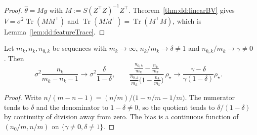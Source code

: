 \begin{proof}
  \leanok
$\hat\theta=My$ with $M:=S(Z^\top Z)^{-1}Z^\top$. Theorem~\ref{thm:dd:linearBV} gives $V=\sigma^2\operatorname{Tr}(MM^\top)$ and
$\operatorname{Tr}(MM^\top)=\operatorname{Tr}(M^\top M)$, which is Lemma~\ref{lem:dd:featureTrace}.
\end{proof}

\begin{theorem}\label{thm:dd:featureLimits}
  \leanok
Let $m_k,n_k,n_{0,k}$ be sequences with $m_k\to\infty$, $n_k/m_k\to\delta\neq1$ and $n_{0,k}/m_k\to\gamma\ne0$. Then
\[
  \sigma^2\frac{n_k}{m_k-n_k-1}\longrightarrow\sigma^2\frac{\delta}{1-\delta},\qquad
  \frac{\frac{n_{0,k}}{m_k}-\frac{n_k}{m_k}}{\frac{n_{0,k}}{m_k}\bigl(1-\frac{n_k}{m_k}\bigr)}\,\rho_\star
  \longrightarrow\frac{\gamma-\delta}{\gamma(1-\delta)}\rho_\star .
\]
\end{theorem}

\begin{proof}
  \leanok
Write $n/(m-n-1)=(n/m)\big/\bigl(1-n/m-1/m\bigr)$. The numerator tends to $\delta$ and the denominator to $1-\delta\ne0$, so the
quotient tends to $\delta/(1-\delta)$ by continuity of division away from zero. The bias is a continuous function of
$(n_0/m,n/m)$ on $\{\gamma\neq0,\delta\ne1\}$.
\end{proof}

